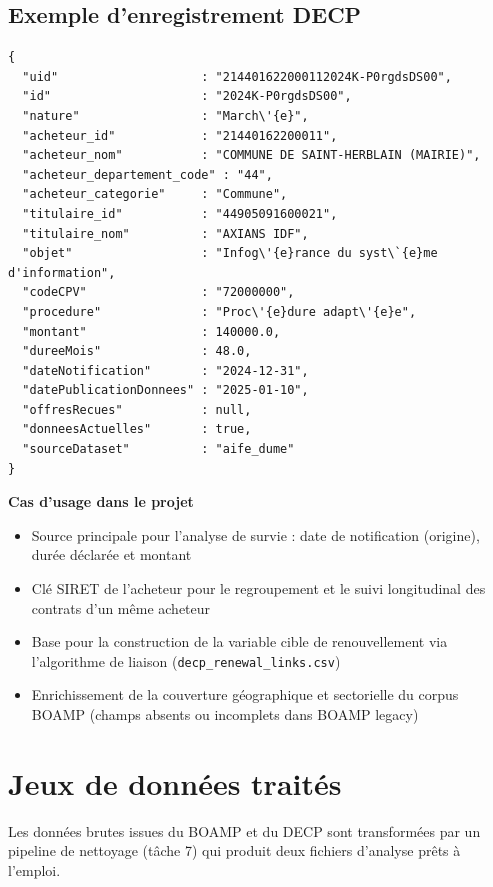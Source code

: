 \documentclass[12pt,a4paper]{article}
\begin{document}
\subsection{Exemple d'enregistrement DECP}

\begin{lstlisting}[language={}]
{
  "uid"                    : "214401622000112024K-P0rgdsDS00",
  "id"                     : "2024K-P0rgdsDS00",
  "nature"                 : "March\'{e}",
  "acheteur_id"            : "21440162200011",
  "acheteur_nom"           : "COMMUNE DE SAINT-HERBLAIN (MAIRIE)",
  "acheteur_departement_code" : "44",
  "acheteur_categorie"     : "Commune",
  "titulaire_id"           : "44905091600021",
  "titulaire_nom"          : "AXIANS IDF",
  "objet"                  : "Infog\'{e}rance du syst\`{e}me d'information",
  "codeCPV"                : "72000000",
  "procedure"              : "Proc\'{e}dure adapt\'{e}e",
  "montant"                : 140000.0,
  "dureeMois"              : 48.0,
  "dateNotification"       : "2024-12-31",
  "datePublicationDonnees" : "2025-01-10",
  "offresRecues"           : null,
  "donneesActuelles"       : true,
  "sourceDataset"          : "aife_dume"
}
\end{lstlisting}

\medskip
\textbf{Cas d'usage dans le projet}

\begin{itemize}
  \item[---] Source principale pour l'analyse de survie : date de notification
    (origine), durée déclarée et montant
  \item[---] Clé SIRET de l'acheteur pour le regroupement et le suivi
    longitudinal des contrats d'un même acheteur
  \item[---] Base pour la construction de la variable cible de renouvellement
    via l'algorithme de liaison (\texttt{decp\_renewal\_links.csv})
  \item[---] Enrichissement de la couverture géographique et sectorielle du
    corpus BOAMP (champs absents ou incomplets dans BOAMP legacy)
\end{itemize}

\section{Jeux de données traités}

Les données brutes issues du BOAMP et du DECP sont transformées par un pipeline
de nettoyage (tâche 7) qui produit deux fichiers d'analyse prêts à l'emploi.
\end{document}
